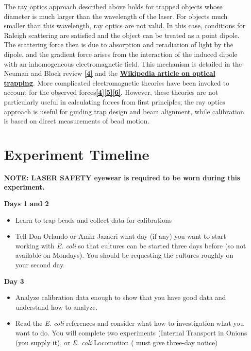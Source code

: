 \documentclass{../lab}
\begin{document}
The ray optics approach described above holds for trapped objects whose diameter is much larger than the wavelength of the laser. For objects much smaller than this wavelength, ray optics are not valid. In this case, conditions for Raleigh scattering are satisfied and the object can be treated as a point dipole. The scattering force then is due to absorption and reradiation of light by the dipole, and the gradient force arises from the interaction of the induced dipole with an inhomogeneous electromagnetic field. This mechanism is detailed in the Neuman and Block review \href{http://rsi.aip.org/resource/1/rsinak/v75/i9/p2787\_s1}{\textbf{[4]}} and the \href{http://en.wikipedia.org/wiki/Optical\_tweezers}{\textbf{Wikipedia article on optical trapping}}. More complicated electromagnetic theories have been invoked to account for the observed forces\href{http://rsi.aip.org/resource/1/rsinak/v75/i9/p2787\_s1}{\textbf{[4]}}\href{http://ajp.aapt.org/resource/1/ajpias/v70/i4/p393\_s1}{\textbf{[5]}}\href{http://sites.google.com/site/shaevitzlab/links}{\textbf{[6]}}. However, these theories are not particularly useful in calculating forces from first principles; the ray optics approach is useful for guiding trap design and beam alignment, while calibration is based on direct measurements of bead motion.

\section{Experiment Timeline}

\textbf{NOTE: LASER  SAFETY eyewear is required to be worn during this experiment.}

\textbf{Days 1 and 2}

\begin{itemize}
    \item Learn to trap beads and collect data for calibrations

    \item Tell Don Orlando or Amin Jazaeri what day (if any) you want to start working with \emph{E. coli} so that cultures can be started three days before (so not available on Mondays). You should be requesting the cultures roughly on your second day.

\end{itemize}

\textbf{Day 3}

\begin{itemize}
    \item Analyze calibration data enough to show that you have good data and understand how to analyze.

    \item Read the \emph{E. coli}  references and consider what how to investigation what you want to do. You will complete two experiments (Internal Transport in Onions (you supply it), or \emph{E. coli} Locomotion ( must give three-day notice)

\end{itemize}
\end{document}
